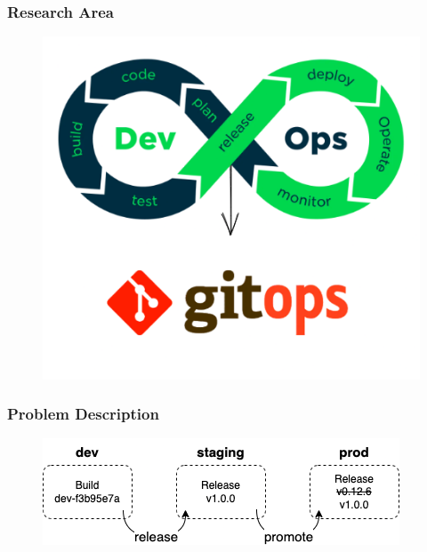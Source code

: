 \documentclass{beamer}
\begin{document}
\begin{frame}
\frametitle{Research Area}
    
\begin{figure}[h]
	\centering
	\includegraphics[width=0.60\linewidth]{assets/devops-gitops.png}
	\label{fig:devopsGitOps}	
\end{figure}




\end{frame}

\begin{frame}
\frametitle{Problem Description}

\begin{figure}[h]
	\centering
	\includegraphics[width=.75\linewidth]{figures/release-promotion.drawio.png}
	\label{fig:releasePromotionProcess}	
\end{figure}



\end{frame}
\end{document}
